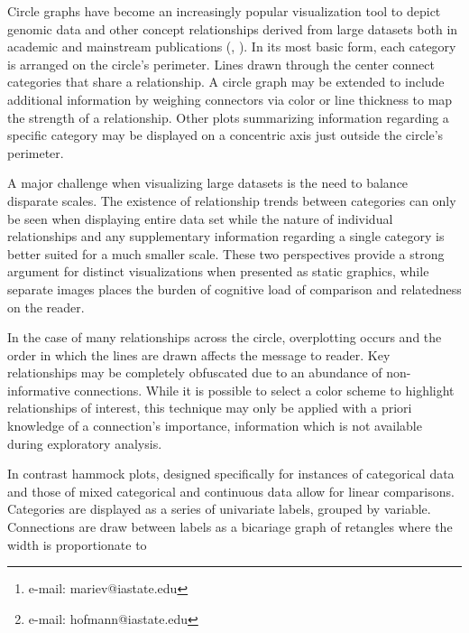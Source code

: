 \documentclass{vgtc}                          %
\title{}
\author{Marie Vendettuoli\thanks{e-mail: mariev@iastate.edu} %
\and Heike Hofmann\thanks{e-mail: hofmann@iastate.edu}\\
\scriptsize Department of Statistics }%
\affiliation{\scriptsize Human Computer Interaction Program \\ Bioinformatics and Computational Biology Program \\ Iowa State University}
\begin{document}


\maketitle

Circle graphs have become an increasingly popular visualization tool to depict genomic data and other concept relationships derived from large datasets both in academic and mainstream publications (\cite{aumann99}, \cite{krzywinski09}). In its most basic form, each category is arranged on the circle’s perimeter. Lines drawn through the center connect categories that share a relationship.  A circle graph may be extended to include additional information by weighing connectors via color or line thickness to map the strength of a relationship. Other plots summarizing information regarding a specific category may be displayed on a concentric axis just outside the circle’s perimeter.

A major challenge when visualizing large datasets is the need to balance disparate scales. The existence of relationship trends between categories can only be seen when displaying entire data set while the nature of individual relationships and any supplementary information regarding a single category is better suited for a much smaller scale. These two perspectives provide a strong argument for distinct visualizations when presented as static graphics, while separate images places the burden of cognitive load of comparison and relatedness on the reader. 

In the case of many relationships across the circle, overplotting occurs and the order in which the lines are drawn affects the message to reader. Key relationships may be completely obfuscated due to an abundance of non-informative connections. While it is possible to select a color scheme to highlight relationships of interest, this technique may only be applied with a priori knowledge of a connection’s importance, information which is not available during exploratory analysis.

In contrast hammock plots, designed specifically for instances of categorical data and those of mixed categorical and continuous data \cite{hammock} allow for linear comparisons. Categories are displayed as a series of univariate labels, grouped  by variable. Connections are draw between labels as a bicariage graph of retangles where the width is proportionate to 
\end{document}
